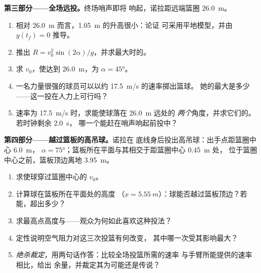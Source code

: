 \begin{problem}
\medskip\noindent\textbf{第三部分——全场远投。}终场哨声即将
响起，诺拉距远端篮圈 \qty{26.0}{m}。
\begin{enumerate}[resume]
  \item 相对 \qty{26.0}{m} 而言，\qty{1.05}{m} 的升高很小：论证
        可采用平地模型，并由 $y(t_f) = 0$ 推导。
  \item 推出 $R = v_0^2\sin(2\alpha)/g$，并求最大时的。
  \item 求 $v_0$，使达到 \qty{26.0}{m}，为 $\alpha = \ang{45}$。
  \item 一名力量很强的球员可以以约 \qty{17.5}{m/s} 的速率掷出篮球。
        她的最大是多少——这一投在人力上可行吗？
  \item 速率为 \qty{17.5}{m/s} 时，求能使球落在 \qty{26.0}{m} 远处的
        \emph{两个}角度，并求它们的。若时钟剩余 \qty{2.0}{s}，
        哪一个能赶在哨声响起前投中？
\end{enumerate}

\medskip\noindent\textbf{第四部分——越过篮板的高吊球。}诺拉在
底线身后投出高吊球：出手点距篮圈中心 \qty{6.0}{m}，
 $\alpha = \ang{75}$；篮板所在平面与其相交于距篮圈中心 \qty{0.45}{m} 处，
位于篮圈中心之前，篮板顶边离地 \qty{3.95}{m}。
\begin{enumerate}[resume]
  \item 求使球穿过篮圈中心的 $v_0$。
  \item 计算球在篮板所在平面处的高度
        （$x = \qty{5.55}{m}$）：球能否越过篮板顶边？若能，超出多少？
  \item 求最高点高度与——观众为何如此喜欢这种投法？
  \item 定性说明空气阻力对这三次投篮有何改变，
        其中哪一次受其影响最大？
  \item \emph{绝杀裁定}，用两句话作答：比较全场投篮所需的速率
        与手臂所能提供的速率相比，给出
        余量，并裁定其为可能还是传说？
\end{enumerate}
\end{problem}
